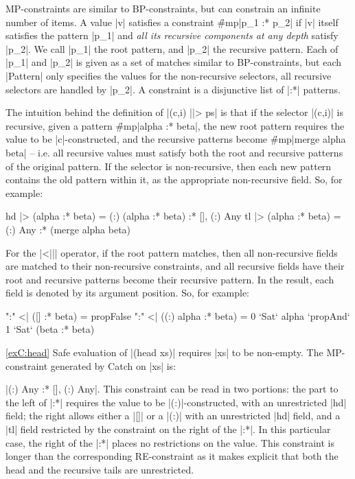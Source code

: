 MP-constraints are similar to BP-constraints, but can constrain an infinite number of items. A value |v| satisfies a constraint \h{#mp}|p_1 :* p_2| if |v| itself satisfies the pattern |p_1| and \textit{all its recursive components at any depth} satisfy |p_2|. We call |p_1| the root pattern, and |p_2| the recursive pattern. Each of |p_1| and |p_2| is given as a set of matches similar to BP-constraints, but each |Pattern| only specifies the values for the non-recursive selectors, all recursive selectors are handled by |p_2|. A constraint is a disjunctive list of |:*| patterns.

The intuition behind the definition of |(c,i) ||> ps| is that if the selector |(c,i)| is recursive, given a pattern \h{#mp}|alpha :* beta|, the new root pattern requires the value to be |c|-constructed, and the recursive patterns become \h{#mp}|merge alpha beta| -- i.e. all recursive values must satisfy both the root and recursive patterns of the original pattern. If the selector is non-recursive, then each new pattern contains the old pattern within it, as the appropriate non-recursive field. So, for example:

\ignore\begin{code}
hd  |> (alpha :* beta) = {(:) (alpha :* beta)  } :* {[], (:) Any}
tl  |> (alpha :* beta) = {(:) Any              } :* (merge alpha beta)
\end{code}

For the |<||| operator, if the root pattern matches, then all non-recursive fields are matched to their non-recursive constraints, and all recursive fields have their root and recursive patterns become their recursive pattern. In the result, each field is denoted by its argument position. So, for example:

\ignore\begin{code}
":" <| ({[]         } :* beta) = propFalse
":" <| ({(:) alpha  } :* beta) = 0 `Sat` alpha `propAnd` 1 `Sat` (beta :* beta)
\end{code}

\begin{examplerevisit}{\ref{exC:head}} Safe evaluation of |(head xs)| requires |xs| to be non-empty. The MP-constraint generated by Catch on |xs| is: \ignore|{(:) Any} :* {[], (:) Any}|. This constraint can be read in two portions: the part to the left of |:*| requires the value to be |(:)|-constructed, with an unrestricted |hd| field; the right allows either a |[]| or a |(:)| with an unrestricted |hd| field, and a |tl| field restricted by the constraint on the right of the |:*|. In this particular case, the right of the |:*| places no restrictions on the value. This constraint is longer than the corresponding RE-constraint as it makes explicit that both the head and the recursive tails are unrestricted.
\end{examplerevisit}

